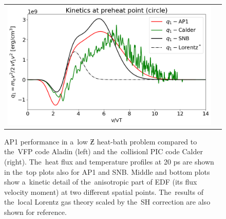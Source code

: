 \begin{figure}[htb]
\begin{center}
\begin{tabular}{cc}
      \includegraphics[width=\figscale\textwidth]{../VFPdata/C7_Calder_case5_nonlocal_kinetics.png}
	\end{tabular}
  \caption{  
  AP1 performance in a~low $\Zbar$ heat-bath problem compared to the~VFP code 
  Aladin (left) and the~collisionl PIC code Calder (right). 
  The~heat flux and temperature
  profiles at 20 ps are shown in the~top plots also for AP1 and SNB.
  Middle and bottom plots show a~kinetic detail of the~anisotropic part
  of EDF (its flux velocity moment) at two different spatial points. 
  The~results of the~local Lorentz gas theory scaled by the~SH correction
  are also shown for reference.
  }
  \label{fig:C7_AladinCalder_case5}
  \end{center} 
\end{figure}

